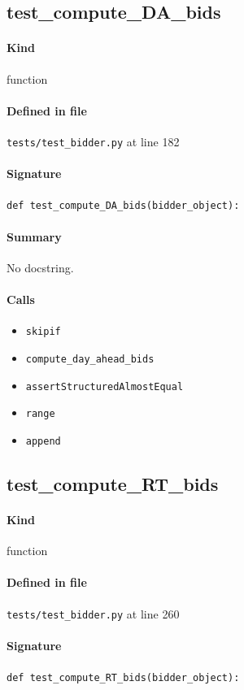 \documentclass[11pt]{report}
\begin{document}
\subsection{test\_compute\_DA\_bids}
\label{def:tests-test_bidder.py:test_compute_DA_bids:L182}
\paragraph{Kind} function
\paragraph{Defined in file} \texttt{tests/test\_bidder.py} at line 182
\paragraph{Signature} \texttt{def test\_compute\_DA\_bids(bidder\_object):}
\paragraph{Summary} No docstring.
\paragraph{Calls}
\begin{itemize}[leftmargin=*]
  \item \texttt{skipif}
  \item \texttt{compute\_day\_ahead\_bids}
  \item \texttt{assertStructuredAlmostEqual}
  \item \texttt{range}
  \item \texttt{append}
\end{itemize}
\subsection{test\_compute\_RT\_bids}
\label{def:tests-test_bidder.py:test_compute_RT_bids:L260}
\paragraph{Kind} function
\paragraph{Defined in file} \texttt{tests/test\_bidder.py} at line 260
\paragraph{Signature} \texttt{def test\_compute\_RT\_bids(bidder\_object):}
\end{document}
